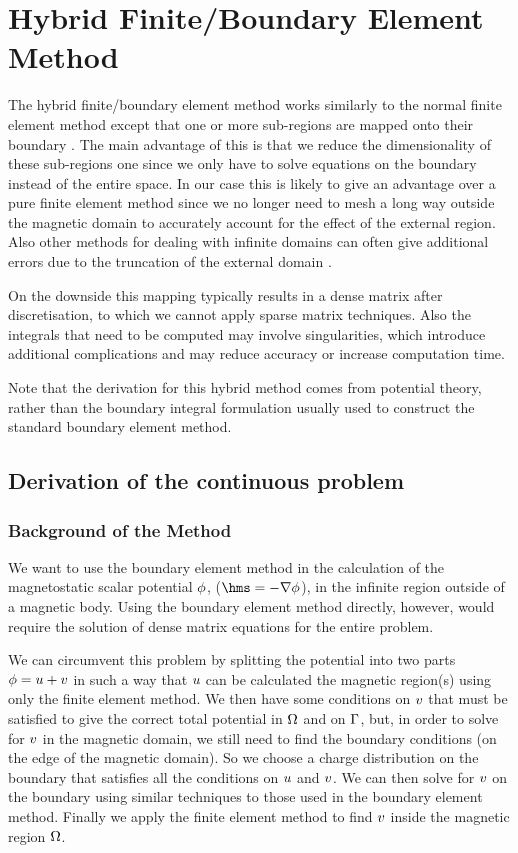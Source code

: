 
\chapter{Hybrid Finite/Boundary Element Method}
\label{sec:hybr-finit-elem}
The hybrid finite/boundary element method works similarly to the normal finite element method except that one or more sub-regions are mapped onto their boundary \cite{Rammohan2002}.
The main advantage of this is that we reduce the dimensionality of these sub-regions one since we only have to solve equations on the boundary instead of the entire space.
In our case this is likely to give an advantage over a pure finite element method since we no longer need to mesh a long way outside the magnetic domain to accurately account for the effect of the external region. Also other methods for dealing with infinite domains can often give additional errors due to the truncation of the external domain \cite{Bottauscio2008}.

On the downside this mapping typically results in a dense matrix after discretisation, to which we cannot apply sparse matrix techniques.
Also the integrals that need to be computed may involve singularities, which introduce additional complications and may reduce accuracy or increase computation time.

Note that the derivation for this hybrid method comes from potential theory, rather than the boundary integral formulation usually used to construct the standard boundary element method.

\section{Derivation of the continuous problem}
\label{sec:bem-derivation}

\subsection{Background of the Method}
\label{sec:basic-method}
We want to use the boundary element method in the calculation of the magnetostatic scalar potential $\phi$, ($\hms = - \nabla \phim$), in the infinite region outside of a magnetic body.
Using the boundary element method directly, however, would require the solution of dense matrix equations for the entire problem.

We can circumvent this problem by splitting the potential into two parts $\phi = u + v$ in such a way that $u$ can be calculated the magnetic region(s) using only the finite element method.
We then have some conditions on $v$ that must be satisfied to give the correct total potential in $\Omega$ and on ${\Gamma}$, but, in order to solve for $v$ in the magnetic domain, we still need to find the boundary conditions (on the edge of the magnetic domain).
So we choose a charge distribution on the boundary that satisfies all the conditions on $u$ and $v$.
We can then solve for $v$ on the boundary using similar techniques to those used in the boundary element method.
Finally we apply the finite element method to find $v$ inside the magnetic region $\Omega$.

